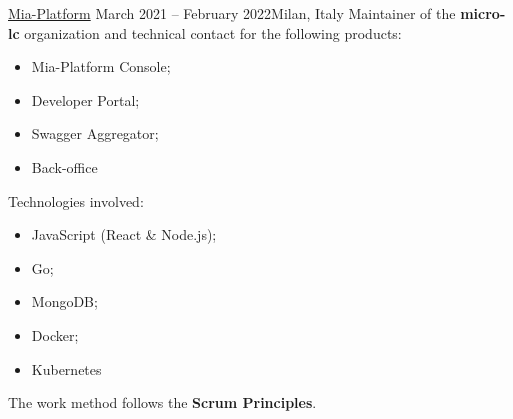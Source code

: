 \documentclass[10pt,a4paper]{altacv}
\begin{document}
{\href{https://mia-platform.eu/}{Mia-Platform}}
{March 2021 -- February 2022}{Milan, Italy}
Maintainer of the \textbf{micro-lc} organization and technical contact for the following products:
\begin{itemize}
	\item Mia-Platform Console;
	\item Developer Portal;
	\item Swagger Aggregator;
	\item Back-office
\end{itemize}
\leavevmode \newline
Technologies involved:
\begin{itemize}
	\item JavaScript (React \& Node.js);
	\item Go;
	\item MongoDB;
	\item Docker;
	\item Kubernetes
\end{itemize}

The work method follows the \textbf{Scrum Principles}.
\divider

\newpage
\end{document}
